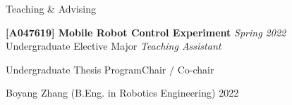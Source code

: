 \begin{rSection}{Teaching \& Advising}

{\bf[A047619] Mobile Robot Control Experiment } \hfill {\em Spring 2022} \\
Undergraduate Elective Major \hfill {\em Teaching Assistant}\\




\begin{rSubsection}{Undergraduate Thesis Program}{}{Chair / Co-chair }{}
  \item Boyang Zhang (B.Eng. in {Robotics Engineering}) \hfill 2022
\end{rSubsection}

\end{rSection}
